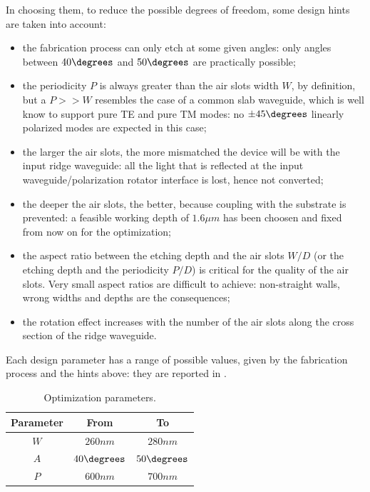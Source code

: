In choosing them, to reduce the possible degrees of freedom, some
design hints are taken into account:
\begin{itemize}
\item
  the fabrication process can only etch at some given angles: only
  angles between $40\degrees$ and $50\degrees$ are practically
  possible;
\item
  the periodicity $P$ is always greater than the air slots width $W$,
  by definition, but a $P >> W$ resembles the case of a common slab
  waveguide, which is well know to support pure TE and pure TM modes:
  no $\pm45\degrees$ linearly polarized modes are expected in this
  case;
\item
  the larger the air slots, the more mismatched the device will be
  with the input ridge waveguide: all the light that is reflected at
  the input waveguide/polarization rotator interface is lost, hence
  not converted;
\item
  the deeper the air slots, the better, because coupling with the
  substrate is prevented: a feasible working depth of $1.6 \mu m$ has
  been choosen and fixed from now on for the optimization;
\item
  the aspect ratio between the etching depth and the air slots $W/D$
  (or the etching depth and the periodicity $P/D$) is critical for the
  quality of the air slots. Very small aspect ratios are difficult to
  achieve: non-straight walls, wrong widths and depths are the
  consequences;
\item
  the rotation effect increases with the number of the air
  slots along the cross section of the ridge waveguide.
\end{itemize}

Each design parameter has a range of possible values, given by the
fabrication process and the hints above: they are reported in
. 

\begin{table}[htbp]
  \begin{center}
    \begin{tabular}{ccc}
      \hline
      Parameter & From & To \\
      \hline
      $W$ & $260 nm$ & $280 nm$ \\
      $A$ & $40 \degrees$ & $50 \degrees$ \\
      $P$ & $600 nm$ & $700 nm$ \\      
      \hline
    \end{tabular}
  \end{center}
  \caption{Optimization parameters.}
  \label{tab:polrot_parameters}
\end{table}

